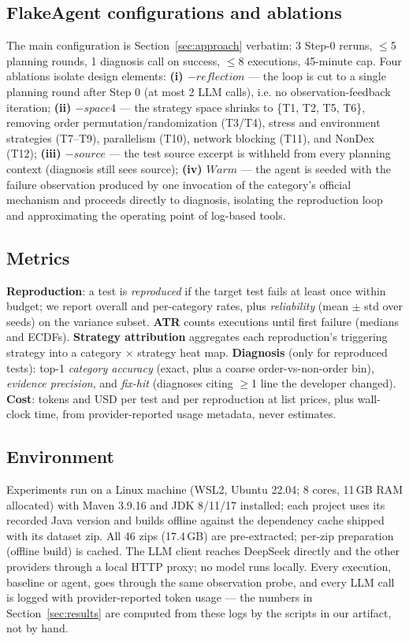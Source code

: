 \subsection{FlakeAgent configurations and ablations}

The main configuration is Section~\ref{sec:approach} verbatim: 3 Step-0
reruns, $\le$5 planning rounds, 1 diagnosis call on success, $\le$8
executions, 45-minute cap. Four ablations isolate design elements:
\textbf{(i) $-reflection$} — the loop is cut to a single planning round
after Step 0 (at most 2 LLM calls), i.e. no observation-feedback iteration;
\textbf{(ii) $-space4$} — the strategy space shrinks to
\{T1, T2, T5, T6\}, removing order permutation/randomization (T3/T4), stress
and environment strategies (T7--T9), parallelism (T10), network blocking
(T11), and NonDex (T12); \textbf{(iii) $-source$} — the test source excerpt
is withheld from every planning context (diagnosis still sees source);
\textbf{(iv) $Warm$} — the agent is seeded with the failure observation
produced by one invocation of the category's official mechanism and proceeds
directly to diagnosis, isolating the reproduction loop and approximating the
operating point of log-based tools.

\subsection{Metrics}

\textbf{Reproduction}: a test is \emph{reproduced} if the target test fails
at least once within budget; we report overall and per-category rates, plus
\emph{reliability} (mean $\pm$ std over seeds) on the variance subset.
\textbf{ATR} counts executions until first failure (medians and ECDFs).
\textbf{Strategy attribution} aggregates each reproduction's triggering
strategy into a category $\times$ strategy heat map. \textbf{Diagnosis} (only
for reproduced tests): top-1 \emph{category accuracy} (exact, plus a coarse
order-vs-non-order bin), \emph{evidence precision}, and \emph{fix-hit}
(diagnoses citing $\ge$1 line the developer changed). \textbf{Cost}: tokens
and USD per test and per reproduction at list prices, plus wall-clock time,
from provider-reported usage metadata, never estimates.

\subsection{Environment}

Experiments run on a Linux machine (WSL2, Ubuntu 22.04; 8 cores, 11\,GB RAM
allocated) with Maven 3.9.16 and JDK 8/11/17 installed; each project uses its
recorded Java version and builds offline against the dependency cache shipped
with its dataset zip. All 46 zips (17.4\,GB) are pre-extracted; per-zip
preparation (offline build) is cached. The LLM client reaches DeepSeek
directly and the other providers through a local HTTP proxy; no model runs
locally. Every execution, baseline or agent, goes through the same
observation probe, and every LLM call is logged with provider-reported token
usage — the numbers in Section~\ref{sec:results} are computed from these logs
by the scripts in our artifact, not by hand.
